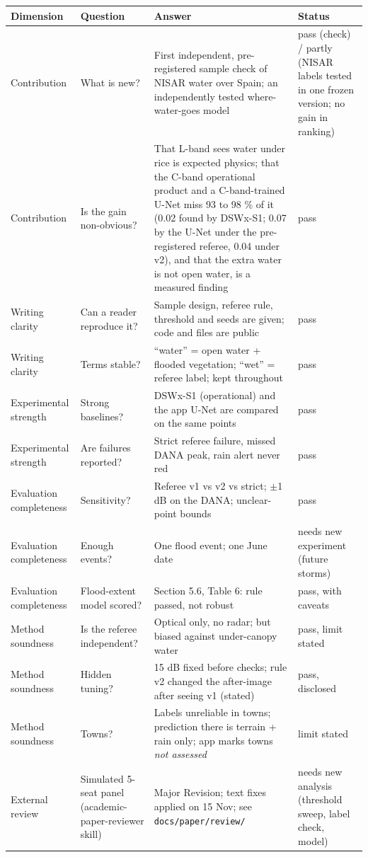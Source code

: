 \documentclass[10pt,twocolumn]{article}
\begin{document}
\begin{center}
\footnotesize
\begin{tabularx}{\textwidth}{LLLL}
\toprule
\textbf{Dimension} & \textbf{Question} & \textbf{Answer} & \textbf{Status} \\
\midrule
{}Contribution & What is new? & First independent, pre-registered sample check of NISAR water over Spain; an independently tested where-water-goes model & pass (check) / partly (NISAR labels tested in one frozen version; no gain in ranking) \\
{}Contribution & Is the gain non-obvious? & That L-band sees water under rice is expected physics; that the C-band operational product and a C-band-trained U-Net miss 93 to 98 \% of it (0.02 found by DSWx-S1; 0.07 by the U-Net under the pre-registered referee, 0.04 under v2), and that the extra water is not open water, is a measured finding & pass \\
{}Writing clarity & Can a reader reproduce it? & Sample design, referee rule, threshold and seeds are given; code and files are public & pass \\
{}Writing clarity & Terms stable? & ``water'' = open water + flooded vegetation; ``wet'' = referee label; kept throughout & pass \\
{}Experimental strength & Strong baselines? & DSWx-S1 (operational) and the app U-Net are compared on the same points & pass \\
{}Experimental strength & Are failures reported? & Strict referee failure, missed DANA peak, rain alert never red & pass \\
{}Evaluation completeness & Sensitivity? & Referee v1 vs v2 vs strict; $\pm$1 dB on the DANA; unclear-point bounds & pass \\
{}Evaluation completeness & Enough events? & One flood event; one June date & needs new experiment (future storms) \\
{}Evaluation completeness & Flood-extent model scored? & Section 5.6, Table 6: rule passed, not robust & pass, with caveats \\
{}Method soundness & Is the referee independent? & Optical only, no radar; but biased against under-canopy water & pass, limit stated \\
{}Method soundness & Hidden tuning? & \textminus{}15 dB fixed before checks; rule v2 changed the after-image after seeing v1 (stated) & pass, disclosed \\
{}Method soundness & Towns? & Labels unreliable in towns; prediction there is terrain + rain only; app marks towns \emph{not assessed} & limit stated \\
{}External review & Simulated 5-seat panel (academic-paper-reviewer skill) & Major Revision; text fixes applied on 15 Nov; see \texttt{docs/\allowbreak{}paper/\allowbreak{}review/\allowbreak{}} & needs new analysis (threshold sweep, label check, model) \\
\bottomrule
\end{tabularx}
\end{center}
\end{document}

